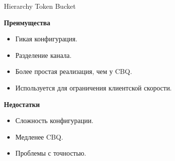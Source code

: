\documentclass[12pt]{beamer}
\begin{document}
\begin{frame}{Hierarchy Token Bucket}
\begin{center}
    {\footnotesize
            \begin{multicols}{2}
				{\bf Преимущества}
				\begin{itemize}
					\item Гикая конфигурация.
					\item Разделение канала.
					\item Более простая реализация, чем у CBQ.
					\item Используется для ограничения клиентской скорости.
				\end{itemize}
            \columnbreak
				{\bf Недостатки}
				\begin{itemize}
					\item Сложность конфигурации.
					\item Медленее CBQ.
					\item Проблемы с точностью.
				\end{itemize}
            \end{multicols}
    }
	\end{center}
\end{frame}
\end{document}
